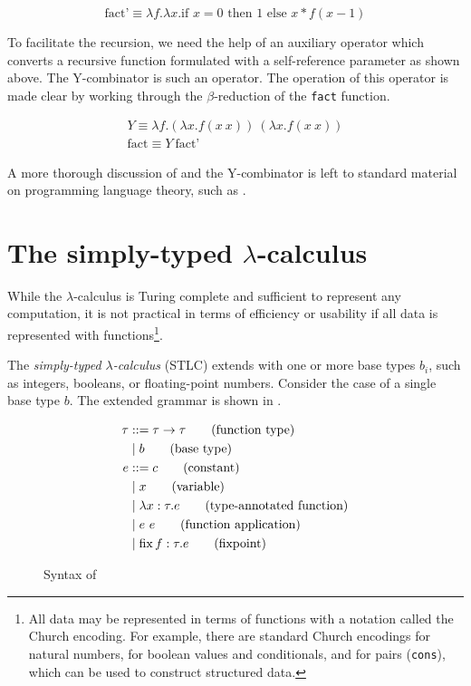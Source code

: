 \[\text{fact'}\equiv\lambda f.\lambda x.\text{if }x=0\text{ then }1\text{ else }x*f(x-1)\]

To facilitate the recursion, we need the help of an auxiliary operator which converts a recursive function formulated with a self-reference parameter as shown above. The Y-combinator is such an operator. The operation of this operator is made clear by working through the $\beta$-reduction of the \texttt{fact} function.

\begin{singlespace}
  \begin{gather*}
    Y\equiv\lambda f.(\lambda x.f(x\ x))\ (\lambda x.f(x\ x)) \\
    \text{fact}\equiv Y\ \text{fact'}
  \end{gather*}
\end{singlespace}

A more thorough discussion of \ulc{} and the Y-combinator is left to standard material on programming language theory, such as \cite{harper2016practical}.

\section{The simply-typed $\lambda$-calculus}
\label{sec:stlc}

While the $\lambda$-calculus is Turing complete and sufficient to represent any computation, it is not practical in terms of efficiency or usability if all data is represented with functions\footnote{All data may be represented in terms of functions with a notation called the Church encoding. For example, there are standard Church encodings for natural numbers, for boolean values and conditionals, and for pairs (\texttt{cons}), which can be used to construct structured data.}.

The \textit{simply-typed $\lambda$-calculus} (STLC) \stlc{} extends \ulc{} with one or more base types $b_i$, such as integers, booleans, or floating-point numbers. Consider the case of a single base type $b$. The extended grammar is shown in .

\begin{figure}
  \centering
  \begin{mdframed}
    \begin{singlespace}
      \begin{align*}
        \tau &::=\tau\to\tau\tag{function type} \\
             &\mid b\tag{base type} \\
        e &::= c\tag{constant} \\
             &\mid x\tag{variable} \\
             &\mid\lambda x:\tau.e\tag{type-annotated function} \\
             &\mid e\ e\tag{function application} \\
             &\mid \operatorname{fix} f:\tau.e\tag{fixpoint}
      \end{align*}
    \end{singlespace}
  \end{mdframed}
  \caption{Syntax of \stlc}
  \label{fig:syntax-gtlc}
\end{figure}

